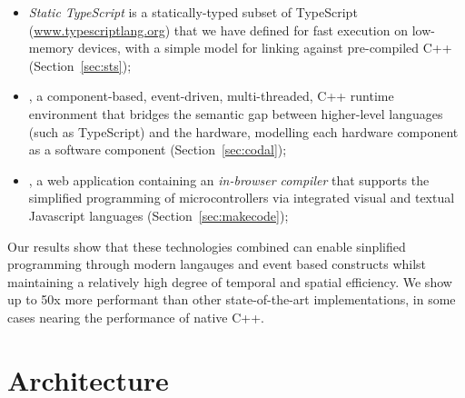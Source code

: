 \begin{itemize}
\item \emph{Static TypeScript} is a statically-typed subset of TypeScript
(\url{www.typescriptlang.org}) that we have defined for fast execution on low-memory devices,
with a simple model for linking against pre-compiled C++ (Section~\ref{sec:sts});

\item \emph{\CO}, a component-based, event-driven, multi-threaded, C++ runtime environment
that bridges the semantic gap between higher-level languages (such as TypeScript) and the hardware,
modelling each hardware component as a software component (Section~\ref{sec:codal});

\item \emph{\MCN}, a web application containing an \emph{in-browser compiler} that supports the 
simplified programming of microcontrollers via integrated visual and textual Javascript languages (Section~\ref{sec:makecode});
\end{itemize}

Our results show that these technologies combined can enable sinplified programming through modern
langauges and event based constructs whilst maintaining a relatively high degree of temporal and spatial efficiency. 
We show up to 50x more performant than other state-of-the-art implementations, in some cases nearing the performance of native C++. 



    


\section{Architecture}








\begin{comment}
Web-based visual editors such as
Blockly (\url{https://developers.google.com/blockly/})~\cite{Blocky2015}
are tremendously popular and allow the creation of programs without the
possibility of syntax errors, and that execute in the web browser (Blockly
is written in JavaScript and compiles user code to JavaScript).
However, JavaScript's dynamic nature is not well-suited to the world of
microcontrollers where memory is limited (consider the Arduino Uno mentioned above).
\end{comment}

